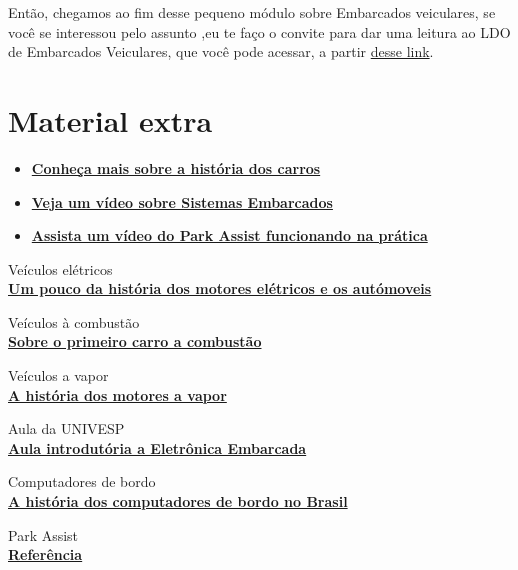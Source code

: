 \documentclass[12pt]{article}
\begin{document}
    Então, chegamos ao fim desse pequeno módulo sobre Embarcados veiculares, se você se interessou pelo assunto
    ,eu te faço o convite para dar uma leitura ao LDO de Embarcados Veiculares, que você
    pode acessar, a partir \href{https://solid-titans.github.io/LDO-Embarcados-Veiculares/}{desse link}.

    \newpage
    \section*{\centering Material extra}\label{sec:extra} %

    \begin{itemize}
        
        \item \href{https://www.youtube.com/watch?v=sZVfhWCfz2g}{\textbf{Conheça mais sobre a história dos carros}}
        
        \item \href{https://www.youtube.com/watch?v=XppU8kKpa6I}{\textbf{Veja um vídeo sobre Sistemas Embarcados}}
    
        \item \href{https://www.youtube.com/watch?v=oVBvOwyCFmg}{\textbf{Assista um vídeo do Park Assist funcionando na prática}}

    \end{itemize}

    \begin{thebibliography}{6}

        Veículos elétricos \\
        \href{https://pt.wikipedia.org/wiki/Ve%C3%ADculo_el%C3%A9trico}{\textbf{Um pouco da história dos motores elétricos e os autómoveis}} 
        
        Veículos à combustão \\
        \href{https://autoesporte.globo.com/carros/noticia/2016/01/130-anos-da-patente-do-primeiro-automovel.ghtml}{\textbf{Sobre o primeiro carro a combustão}}

        Veículos a vapor \\
        \href{http://www.sinaldetransito.com.br/curiosidades_foto.php?IDcuriosidade=38}{\textbf{A história dos motores a vapor}}
        
        Aula da UNIVESP \\
        \href{https://youtu.be/ElIMxXcFkGQ}{\textbf{Aula introdutória a Eletrônica Embarcada}}

        Computadores de bordo \\
        \href{https://loucosporcarro.com.br/computadores-de-bordo/}{\textbf{A história dos computadores de bordo no Brasil}}

        Park Assist \\
        \href{https://en.wikipedia.org/wiki/Intelligent_Parking_Assist_System}{\textbf{Referência}}
    \end{thebibliography}

    
\end{document}

